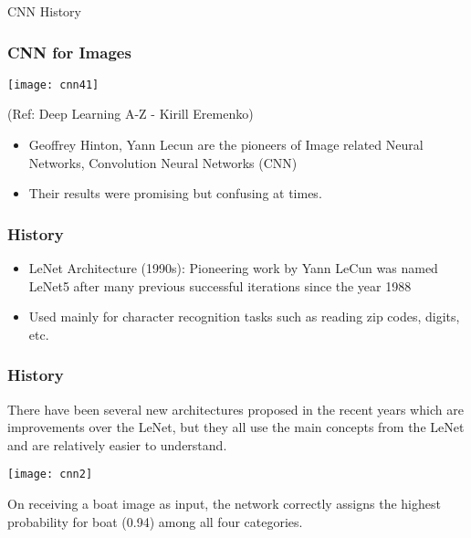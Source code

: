 \begin{frame}
  \begin{center}
    {\Large CNN History}
  \end{center}
\end{frame}



\begin{frame}[fragile] \frametitle{CNN for Images}

\begin{center}
\texttt{[image: cnn41]}

\tiny{(Ref: Deep Learning A-Z - Kirill Eremenko)}
\end{center}

\begin{itemize}
\item Geoffrey Hinton, Yann Lecun are the pioneers of Image related Neural Networks, Convolution Neural Networks (CNN)
\item Their results were promising but confusing at times.
\end{itemize}


\end{frame}

\begin{frame}[fragile] \frametitle{History}


\begin{itemize}
\item LeNet Architecture (1990s): Pioneering work by Yann LeCun was named LeNet5 after many previous successful iterations since the year 1988 
\item Used mainly for character recognition tasks such as reading zip codes, digits, etc.

\end{itemize}
\end{frame}

\begin{frame}[fragile] \frametitle{History}
There have been several new architectures proposed in the recent years which are improvements over the LeNet, but they all use the main concepts from the LeNet and are relatively easier to understand.

\begin{center}
\texttt{[image: cnn2]}
\end{center}
On receiving a boat image as input, the network correctly assigns the highest probability for boat (0.94) among all four categories. 
\end{frame}



